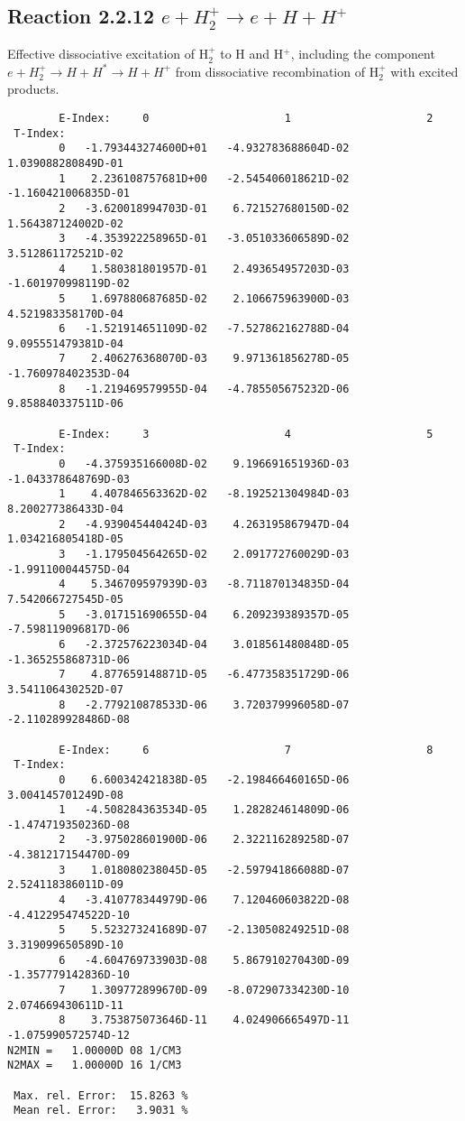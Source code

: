 \documentclass[12pt,dvipdfmx]{article}
\begin{document}
\subsection{
Reaction 2.2.12 $  e + H_2^+   \rightarrow  e + H + H^+  $
}
Effective dissociative excitation of H$_2^+$ to H and H$^+$, including the
component $e+H_2^+ \rightarrow H + H^* \rightarrow H + H^+$ from dissociative recombination of H$_2^+$ with excited products.

\begin{small}\begin{verbatim}
        E-Index:     0                     1                     2
 T-Index:
        0   -1.793443274600D+01   -4.932783688604D-02    1.039088280849D-01
        1    2.236108757681D+00   -2.545406018621D-02   -1.160421006835D-01
        2   -3.620018994703D-01    6.721527680150D-02    1.564387124002D-02
        3   -4.353922258965D-01   -3.051033606589D-02    3.512861172521D-02
        4    1.580381801957D-01    2.493654957203D-03   -1.601970998119D-02
        5    1.697880687685D-02    2.106675963900D-03    4.521983358170D-04
        6   -1.521914651109D-02   -7.527862162788D-04    9.095551479381D-04
        7    2.406276368070D-03    9.971361856278D-05   -1.760978402353D-04
        8   -1.219469579955D-04   -4.785505675232D-06    9.858840337511D-06

        E-Index:     3                     4                     5
 T-Index:
        0   -4.375935166008D-02    9.196691651936D-03   -1.043378648769D-03
        1    4.407846563362D-02   -8.192521304984D-03    8.200277386433D-04
        2   -4.939045440424D-03    4.263195867947D-04    1.034216805418D-05
        3   -1.179504564265D-02    2.091772760029D-03   -1.991100044575D-04
        4    5.346709597939D-03   -8.711870134835D-04    7.542066727545D-05
        5   -3.017151690655D-04    6.209239389357D-05   -7.598119096817D-06
        6   -2.372576223034D-04    3.018561480848D-05   -1.365255868731D-06
        7    4.877659148871D-05   -6.477358351729D-06    3.541106430252D-07
        8   -2.779210878533D-06    3.720379996058D-07   -2.110289928486D-08

        E-Index:     6                     7                     8
 T-Index:
        0    6.600342421838D-05   -2.198466460165D-06    3.004145701249D-08
        1   -4.508284363534D-05    1.282824614809D-06   -1.474719350236D-08
        2   -3.975028601900D-06    2.322116289258D-07   -4.381217154470D-09
        3    1.018080238045D-05   -2.597941866088D-07    2.524118386011D-09
        4   -3.410778344979D-06    7.120460603822D-08   -4.412295474522D-10
        5    5.523273241689D-07   -2.130508249251D-08    3.319099650589D-10
        6   -4.604769733903D-08    5.867910270430D-09   -1.357779142836D-10
        7    1.309772899670D-09   -8.072907334230D-10    2.074669430611D-11
        8    3.753875073646D-11    4.024906665497D-11   -1.075990572574D-12
N2MIN =   1.00000D 08 1/CM3
N2MAX =   1.00000D 16 1/CM3

 Max. rel. Error:  15.8263 %
 Mean rel. Error:   3.9031 %

\end{verbatim}\end{small}
\end{document}
